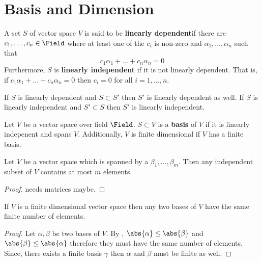 \section{Basis and Dimension}
\begin{definition}
    A set \(S\) of vector space \(V\) is said to be \textbf{linearly dependent}if there are \(c_1, \dots , c_n \in \Field\) where at least one of the \(c_i\) is non-zero and \(\alpha_1, \dots , \alpha_n\) such that
    \begin{equation*}
        c_1 \alpha_1 + \dots + c_n \alpha_n = 0
    \end{equation*}
    Furthermore, \(S\) is \textbf{linearly independent} if it is not linearly dependent. That is, if \(c_1 \alpha_1 + \dots + c_n \alpha_n = 0\) then \(c_i = 0\) for all \(i = 1 , \dots , n\).
\end{definition}

\begin{corollary}
    If \(S\) is linearly dependent and \(S \subset S'\) then \(S'\) is linearly dependent as well. If \(S\) is linearly independent and \(S' \subset S\) then \(S'\) is linearly independent.
\end{corollary}

\begin{definition}[Basis]
    Let \(V\) be a vector space over field \(\Field\). \(S \subset V\) is a \textbf{basis} of \(V\) if it is linearly indepenent and spans \(V\). Additionally, \(V\) is finite dimensional if \(V\) has a finite basis.
\end{definition}

\begin{theorem} \label{th:BasisUpperLimit}
    Let \(V\) be a vector space which is spanned by a \(\beta_1 ,\dots , \beta_m\). Then any independent subset of \(V\) contains at most \(m\) elements.
\end{theorem}

\begin{proof}
    needs matrices maybe.
\end{proof}

\begin{corollary} \label{col:EqualityOfBasis}
    If \(V\) is a finite dimensional vector space then any two bases of \(V\) have the same finite number of elements.
\end{corollary}

\begin{proof}
    Let \(\alpha, \beta \) be two bases of \(V\). By , \(\abs{\alpha} \leq \abs{\beta}\) and \(\abs{\beta} \leq \abs{\alpha}\) therefore they must have the same number of elements. Since, there exists a finite basis \(\gamma\) then \(\alpha\) and \(\beta\) must be finite as well.
\end{proof}

